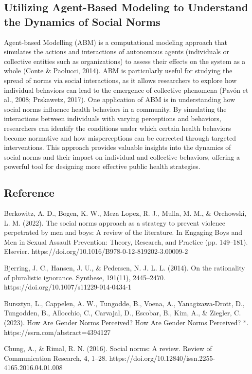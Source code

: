 \documentclass{article}
\begin{document}
\subsection*{Utilizing Agent-Based Modeling to Understand the Dynamics of Social Norms}
Agent-based Modelling (ABM) is a computational modeling approach that simulates the actions and interactions of autonomous agents (individuals or collective entities such as organizations) to assess their effects on the system as a whole (Conte & Paolucci, 2014). ABM is particularly useful for studying the spread of norms via social interactions, as it allows researchers to explore how individual behaviors can lead to the emergence of collective phenomena (Pavón et al., 2008; Prskawetz, 2017). One application of ABM is in understanding how social norms influence health behaviors in a community. By simulating the interactions between individuals with varying perceptions and behaviors, researchers can identify the conditions under which certain health behaviors become normative and how misperceptions can be corrected through targeted interventions. This approach provides valuable insights into the dynamics of social norms and their impact on individual and collective behaviors, offering a powerful tool for designing more effective public health strategies.

\subsection*{Reference}
Berkowitz, A. D., Bogen, K. W., Meza Lopez, R. J., Mulla, M. M., & Orchowski, L. M. (2022). The social norms approach as a strategy to prevent violence perpetrated by men and boys: A review of the literature. In Engaging Boys and Men in Sexual Assault Prevention: Theory, Research, and Practice (pp. 149–181). Elsevier. https://doi.org/10.1016/B978-0-12-819202-3.00009-2

Bjerring, J. C., Hansen, J. U., & Pedersen, N. J. L. L. (2014). On the rationality of pluralistic ignorance. Synthese, 191(11), 2445–2470. https://doi.org/10.1007/s11229-014-0434-1

Bursztyn, L., Cappelen, A. W., Tungodde, B., Voena, A., Yanagizawa-Drott, D., Tungodden, B., Allocchio, C., Carvajal, D., Escobar, B., Kim, A., & Ziegler, C. (2023). How Are Gender Norms Perceived? How Are Gender Norms Perceived? *. https://ssrn.com/abstract=4394127

Chung, A., & Rimal, R. N. (2016). Social norms: A review. Review of Communication Research, 4, 1–28. https://doi.org/10.12840/issn.2255-4165.2016.04.01.008
\end{document}
